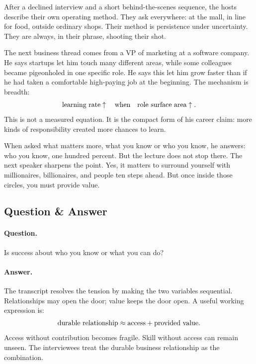 After a declined interview and a short behind-the-scenes sequence, the hosts describe their own operating method. They ask everywhere: at the mall, in line for food, outside ordinary shops. Their method is persistence under uncertainty. They are always, in their phrase, shooting their shot.

The next business thread comes from a VP of marketing at a software company. He says startups let him touch many different areas, while some colleagues became pigeonholed in one specific role. He says this let him grow faster than if he had taken a comfortable high-paying job at the beginning. The mechanism is breadth:
\begin{equation}
\hbox{learning rate}
  \uparrow
  \quad\hbox{when}\quad
  \hbox{role surface area}
  \uparrow .
\end{equation}
This is not a measured equation. It is the compact form of his career claim: more kinds of responsibility created more chances to learn.

When asked what matters more, what you know or who you know, he answers: who you know, one hundred percent. But the lecture does not stop there. The next speaker sharpens the point. Yes, it matters to surround yourself with millionaires, billionaires, and people ten steps ahead. But once inside those circles, you must provide value.

\subsection{Question \& Answer}

\paragraph{Question.}
Is success about who you know or what you can do?

\paragraph{Answer.}
The transcript resolves the tension by making the two variables sequential. Relationships may open the door; value keeps the door open. A useful working expression is:
\begin{equation}
\hbox{durable relationship}
  \approx
  \hbox{access}
  +
  \hbox{provided value}.
\end{equation}
Access without contribution becomes fragile. Skill without access can remain unseen. The interviewees treat the durable business relationship as the combination.

